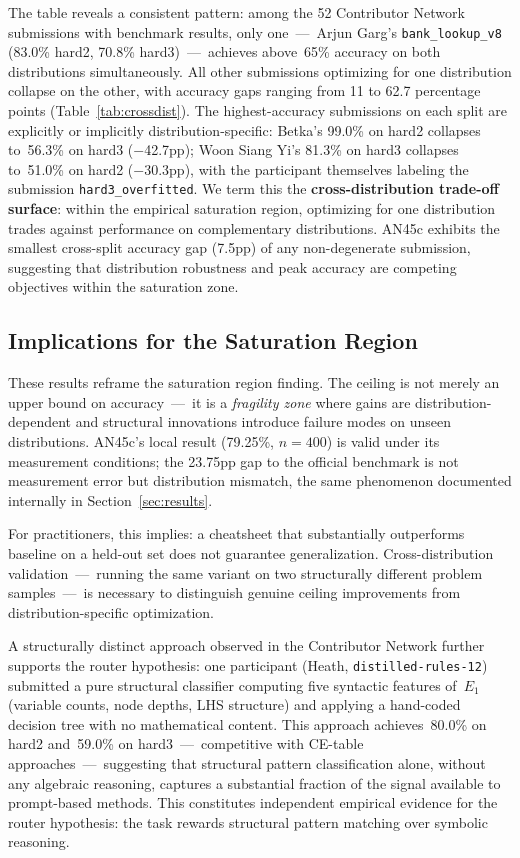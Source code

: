 \documentclass[11pt]{article}
\begin{document}
The table reveals a consistent pattern: among the 52 Contributor
Network submissions with benchmark results, only one~---~Arjun Garg's
\texttt{bank\_lookup\_v8} (83.0\% hard2, 70.8\% hard3)~---~achieves
above~65\% accuracy on both distributions simultaneously. All other
submissions optimizing for one distribution collapse on the other, with
accuracy gaps ranging from 11 to 62.7 percentage points
(Table~\ref{tab:crossdist}). The highest-accuracy submissions on each split
are explicitly or implicitly distribution-specific: Betka's 99.0\% on
hard2 collapses to~56.3\% on hard3 ($-$42.7pp); Woon Siang Yi's
81.3\% on hard3 collapses to~51.0\% on hard2 ($-$30.3pp), with the
participant themselves labeling the submission \texttt{hard3\_overfitted}.
We term this the \textbf{cross-distribution trade-off surface}: within
the empirical saturation region, optimizing for one distribution trades
against performance on complementary distributions. AN45c exhibits the
smallest cross-split accuracy gap (7.5pp) of any non-degenerate
submission, suggesting that distribution robustness and peak accuracy
are competing objectives within the saturation zone.

\subsection{Implications for the Saturation Region}

These results reframe the saturation region finding. The ceiling is not
merely an upper bound on accuracy~---~it is a \emph{fragility zone}
where gains are distribution-dependent and structural innovations
introduce failure modes on unseen distributions. AN45c's local result
(79.25\%, $n=400$) is valid under its measurement conditions; the
23.75pp gap to the official benchmark is not measurement error but
distribution mismatch, the same phenomenon documented internally in
Section~\ref{sec:results}.

For practitioners, this implies: a cheatsheet that substantially
outperforms baseline on a held-out set does not guarantee
generalization. Cross-distribution validation~---~running the same
variant on two structurally different problem samples~---~is necessary
to distinguish genuine ceiling improvements from distribution-specific
optimization.

A structurally distinct approach observed in the Contributor Network
further supports the router hypothesis: one participant (Heath,
\texttt{distilled-rules-12}) submitted a pure structural classifier
computing five syntactic features of~$E_1$ (variable counts, node
depths, LHS structure) and applying a hand-coded decision tree with no
mathematical content. This approach achieves~80.0\% on hard2 and~59.0\%
on hard3~---~competitive with CE-table approaches~---~suggesting that
structural pattern classification alone, without any algebraic
reasoning, captures a substantial fraction of the signal available to
prompt-based methods. This constitutes independent empirical evidence
for the router hypothesis: the task rewards structural pattern matching
over symbolic reasoning.
\end{document}
